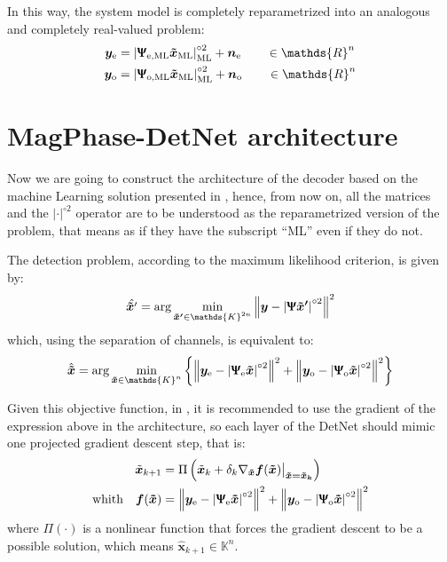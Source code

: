 In this way, the system model is completely reparametrized into an analogous and completely real-valued problem:
\begin{align}
	\bm y_\text{e} &= \left|\bm{\Uppsi_\text{e,ML}\tilde{x}_\text{ML} } \right|^{\circ2}_\text{ML}+\bm n_\text{e}\qquad\in\mathds{R}^n\\
	\bm y_\text{o} &= \left|\bm{\Uppsi_\text{o,ML}\tilde{x}_\text{ML} } \right|^{\circ2}_\text{ML}+\bm n_\text{o}\qquad\in\mathds{R}^n
\end{align}



\section{MagPhase-DetNet architecture}

Now we are going to construct the architecture of the decoder based on the machine Learning solution presented in \cite{Neev_2019}, hence, from now on, all the matrices and the $|\cdot|^{\circ2}$ operator are to be understood as the reparametrized version of the problem, that means as if they have the subscript ``ML'' even if they do not.

The detection problem, according to the maximum likelihood criterion, is given by:
\begin{align}
	\hat{\bm{\tilde{x}}'} = \arg \min_{\bm{\tilde{x}'} \in \mathds{K}^{2n}} \left\lVert \bm y - \left|\bm{\Uppsi}\bm{\tilde{x}'}  \right|^{\circ2}\right\rVert^2
\end{align}
which, using the separation of channels, is equivalent to:
\begin{align}
	\hat{\bm{\tilde{x}}} = \arg \min_{\bm{\tilde{x}} \in \mathds{K}^{n}}\left\{ \left\lVert \bm y_\text{e} - \left|\bm{\Uppsi}_\text{e}\bm{\tilde{x}}  \right|^{\circ2}\right\rVert^2+\left\lVert \bm y_\text{o} - \left|\bm{\Uppsi}_\text{o}\bm{\tilde{x}}  \right|^{\circ2}\right\rVert^2\right\}
\end{align}

Given this objective function, in \cite{Neev_2019}, it is recommended to use the gradient of the expression above in the architecture, so each layer of the DetNet should mimic one projected gradient descent step, that is:
\begin{align*}
	\tilde{\bm x}_{k+1}&=\Pi\left(\tilde{\bm x}_{k}+\delta_k \nabla_{\bm{\tilde{x}}}\bm{f}(\bm{\tilde{x}}) \bigr|_{\bm{\tilde{x}=\tilde{x}_k}}\right)\\
	\text{whith}\quad \bm{f}(\bm{\tilde{x}})&=\left\lVert \bm y_\text{e} - \left|\bm{\Uppsi}_\text{e}\bm{\tilde{x}}  \right|^{\circ2}\right\rVert^2+\left\lVert \bm y_\text{o} - \left|\bm{\Uppsi}_\text{o}\bm{\tilde{x}}  \right|^{\circ2}\right\rVert^2
\end{align*}
where $\Pi(\cdot)$ is a nonlinear function that forces the gradient descent to be a possible solution, which means $\hat{\bm x}_{k+1}\in \mathds{K}^n$.

